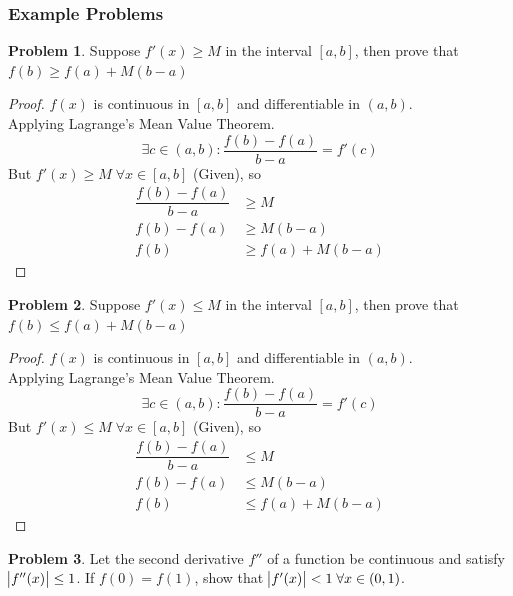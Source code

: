 \documentclass[14]{article}
\theoremstyle{definition}
\newtheorem{prob}{Problem}
\begin{document}
\subsubsection{Example Problems}
\begin{prob}
Suppose $f'(x) \geq M$ in the interval $[a, b]$, then prove that $f(b) \geq f(a) + M(b - a)$
\end{prob}
\begin{proof}
$f(x)$ is continuous in $[a, b]$ and differentiable in $(a, b)$.\\
Applying Lagrange's Mean Value Theorem.
\[\exists c \in (a, b) : \dfrac{f(b) - f(a)}{b - a} = f'(c)\]
But $f'(x) \geq M \; \forall x \in [a, b]$ (Given), so\\
\begin{align*}
\dfrac{f(b) - f(a)}{b - a} &\geq M\\
f(b) - f(a) &\geq M (b - a)\\
f(b) &\geq f(a) + M (b - a)
\end{align*}
\end{proof}
\begin{prob}
Suppose $f'(x) \leq M$ in the interval $[a, b]$, then prove that $f(b) \leq f(a) + M(b - a)$
\end{prob}
\begin{proof}
$f(x)$ is continuous in $[a, b]$ and differentiable in $(a, b)$.\\
Applying Lagrange's Mean Value Theorem.
\[\exists c \in (a, b) : \dfrac{f(b) - f(a)}{b - a} = f'(c)\]
But $f'(x) \leq M \; \forall x \in [a, b]$ (Given), so\\
\begin{align*}
\dfrac{f(b) - f(a)}{b - a} &\leq M\\
f(b) - f(a) &\leq M (b - a)\\
f(b) &\leq f(a) + M (b - a)
\end{align*}
\end{proof}
\begin{prob}
Let the second derivative $f''$ of a function be continuous and satisfy $\abs{f''(x)} \leq 1$. If $f(0) = f(1)$, show that $\abs{f'(x)} < 1 \;\forall x \in (0, 1)$.
\end{prob}
\end{document}
